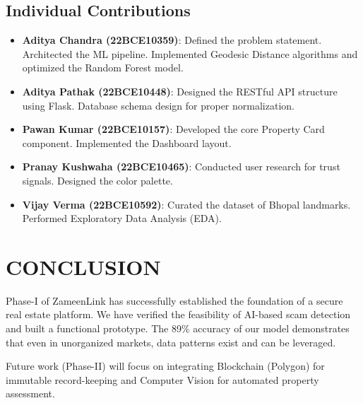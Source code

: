 \documentclass[12pt,a4paper]{report}
\begin{document}
\section{Individual Contributions}
\begin{itemize}
    \item \textbf{Aditya Chandra (22BCE10359)}: Defined the problem statement. Architected the ML pipeline. Implemented Geodesic Distance algorithms and optimized the Random Forest model.
    \item \textbf{Aditya Pathak (22BCE10448)}: Designed the RESTful API structure using Flask. Database schema design for proper normalization.
    \item \textbf{Pawan Kumar (22BCE10157)}: Developed the core Property Card component. Implemented the Dashboard layout.
    \item \textbf{Pranay Kushwaha (22BCE10465)}: Conducted user research for trust signals. Designed the color palette.
    \item \textbf{Vijay Verma (22BCE10592)}: Curated the dataset of Bhopal landmarks. Performed Exploratory Data Analysis (EDA).
\end{itemize}

\chapter{CONCLUSION}
Phase-I of ZameenLink has successfully established the foundation of a secure real estate platform. We have verified the feasibility of AI-based scam detection and built a functional prototype. The 89\% accuracy of our model demonstrates that even in unorganized markets, data patterns exist and can be leveraged.

Future work (Phase-II) will focus on integrating Blockchain (Polygon) for immutable record-keeping and Computer Vision for automated property assessment.
\end{document}
